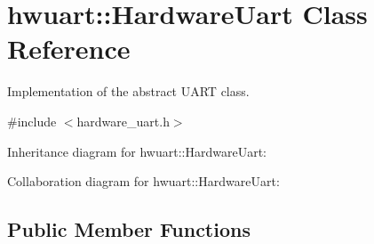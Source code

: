 \hypertarget{classhwuart_1_1HardwareUart}{}\section{hwuart\+:\+:Hardware\+Uart Class Reference}
\label{classhwuart_1_1HardwareUart}


Implementation of the abstract U\+A\+RT class.  




{\ttfamily \#include $<$hardware\+\_\+uart.\+h$>$}



Inheritance diagram for hwuart\+:\+:Hardware\+Uart\+:


Collaboration diagram for hwuart\+:\+:Hardware\+Uart\+:
\subsection*{Public Member Functions}
